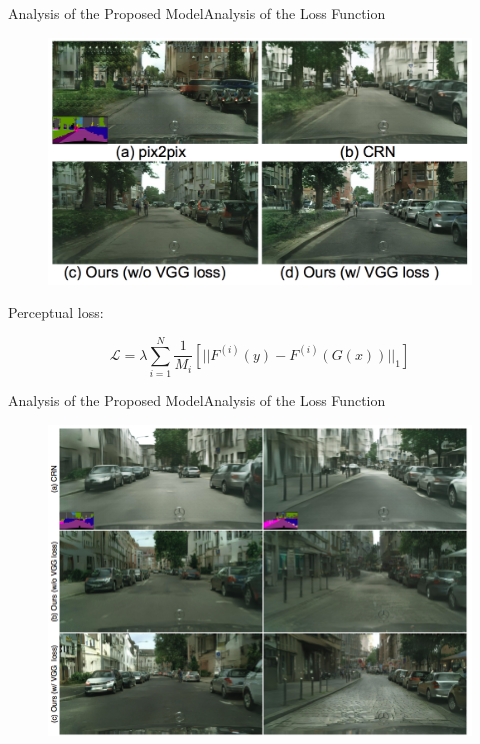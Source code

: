 \documentclass{beamer}
\begin{document}
\begin{frame}{Analysis of the Proposed Model}{Analysis of the Loss Function}
\begin{figure}
	\centering
	\includegraphics[height=0.6\textheight]{images/result_1}
\end{figure}
%
%
\begin{beamerboxesrounded}[upper=uppercol,lower=lowercol,shadow=false]{Perceptual loss: }
	
\begin{equation}
\mathcal{L}=\lambda\sum_{i=1}^N \frac{1}{M_i}[||F^{(i)}(y)-F^{(i)}(G(x))||_1]
\end{equation} 

\end{beamerboxesrounded}
\end{frame}


\begin{frame}{Analysis of the  Proposed Model}{Analysis of the Loss Function}
\begin{figure}
	\centering
	\includegraphics[height=0.8\textheight]{images/result_3}
\end{figure}
\end{frame}
\end{document}
